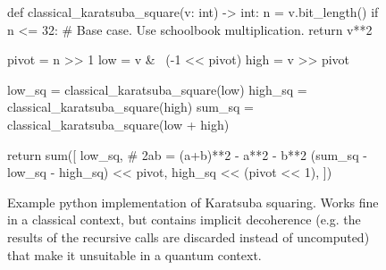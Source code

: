 \documentclass[onecolumn,unpublished]{quantumarticle}
\begin{document}
\begin{figure}
\begin{python}
def classical_karatsuba_square(v: int) -> int:
    n = v.bit_length()
    if n <= 32:
        # Base case. Use schoolbook multiplication.
        return v**2

    pivot = n >> 1
    low = v & ~(-1 << pivot)
    high = v >> pivot

    low_sq = classical_karatsuba_square(low)
    high_sq = classical_karatsuba_square(high)
    sum_sq = classical_karatsuba_square(low + high)

    return sum([
        low_sq,
        # 2ab = (a+b)**2 - a**2 - b**2
        (sum_sq - low_sq - high_sq) << pivot,
        high_sq << (pivot << 1),
    ])
\end{python}
\caption{
\label{fig:classical_code}
   Example python implementation of Karatsuba squaring.
   Works fine in a classical context, but contains implicit decoherence (e.g. the results of the recursive calls are discarded instead of uncomputed) that make it unsuitable in a quantum context.
}
\end{figure}
\end{document}
